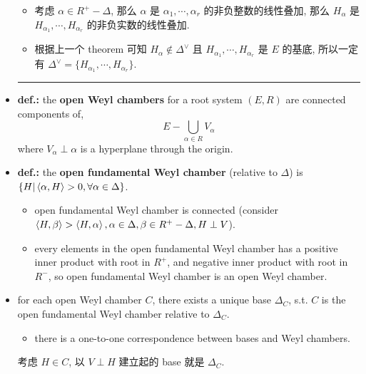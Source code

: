 \begin{itemize}
\begin{tcolorbox}[title=proof:]
\begin{itemize}
			\item 考虑 $\alpha \in R^+ - \Delta$, 那么 $\alpha$ 是 $\alpha_1, \cdots, \alpha_r$ 的非负整数的线性叠加, 那么 $H_\alpha$ 是 $H_{\alpha_1}, \cdots, H_{\alpha_r}$ 的非负实数的线性叠加.
			
			\item 根据上一个 theorem 可知 $H_\alpha \notin \Delta^\vee$ 且 $H_{\alpha_1}, \cdots, H_{\alpha_r}$ 是 $E$ 的基底, 所以一定有 $\Delta^\vee = \{H_{\alpha_1}, \cdots, H_{\alpha_r}\}$.
		\end{itemize}
	\end{tcolorbox}
	
	\noindent\rule[0.5ex]{\linewidth}{0.5pt} %
	
	\item \textbf{def.:} the \textbf{open Weyl chambers} for a root system $(E, R)$ are connected components of,
	\begin{equation}
		E - \bigcup_{\alpha \in R} V_\alpha
	\end{equation}
	where $V_\alpha \perp \alpha$ is a hyperplane through the origin.
	
	\item \textbf{def.:} the \textbf{open fundamental Weyl chamber} (relative to $\Delta$) is $\{H | \braket{\alpha, H} > 0, \forall \alpha \in \Delta\}$.
	\begin{itemize}
		\item open fundamental Weyl chamber is connected (consider $\braket{H, \beta} > \braket{H, \alpha}, \alpha \in \Delta, \beta \in R^+ - \Delta, H \perp V$).
		
		\item every elements in the open fundamental Weyl chamber has a positive inner product with root in $R^+$, and negative inner product with root in $R^-$, so open fundamental Weyl chamber is an open Weyl chamber.
	\end{itemize}
	
	\item for each open Weyl chamber $C$, there exists a unique base $\Delta_C$, s.t. $C$ is the open fundamental Weyl chamber relative to $\Delta_C$.
	\begin{itemize}
		\item there is a one-to-one correspondence between bases and Weyl chambers.
	\end{itemize}
	
	\begin{tcolorbox}[title=proof:]
		考虑 $H \in C$, 以 $V \perp H$ 建立起的 base 就是 $\Delta_C$.
		

\end{tcolorbox}
\end{itemize}
